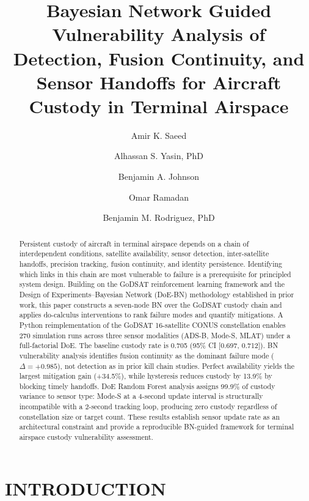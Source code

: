 \documentclass[]{spie}
\title{Bayesian Network Guided Vulnerability Analysis of Detection, Fusion Continuity, and Sensor Handoffs for Aircraft Custody in Terminal Airspace}
\author[a]{Amir K. Saeed}
\author[a]{Alhassan S. Yasin, PhD}
\author[a]{Benjamin A. Johnson}
\author[a]{Omar Ramadan}
\author[a]{Benjamin M. Rodriguez, PhD}
\affil[a]{Whiting School of Engineering EP Program, Johns Hopkins University}
\begin{document}
\maketitle

\begin{abstract}
Persistent custody of aircraft in terminal airspace depends on a chain of interdependent conditions, satellite availability, sensor detection, inter-satellite handoffs, precision tracking, fusion continuity, and identity persistence. Identifying which links in this chain are most vulnerable to failure is a prerequisite for principled system design. Building on the GoDSAT reinforcement learning framework and the Design of Experiments–Bayesian Network (DoE-BN) methodology established in prior work, this paper constructs a seven-node BN over the GoDSAT custody chain and applies do-calculus interventions to rank failure modes and quantify mitigations. A Python reimplementation of the GoDSAT 16-satellite CONUS constellation enables 270 simulation runs across three sensor modalities (ADS-B, Mode-S, MLAT) under a full-factorial DoE. The baseline custody rate is 0.705 (95\% CI [0.697, 0.712]). BN vulnerability analysis identifies fusion continuity as the dominant failure mode ($\Delta = +0.985$), not detection as in prior kill chain studies. Perfect availability yields the largest mitigation gain (+34.5\%), while hysteresis reduces custody by 13.9\% by blocking timely handoffs. DoE Random Forest analysis assigns 99.9\% of custody variance to sensor type: Mode-S at a 4-second update interval is structurally incompatible with a 2-second tracking loop, producing zero custody regardless of constellation size or target count. These results establish sensor update rate as an architectural constraint and provide a reproducible BN-guided framework for terminal airspace custody vulnerability assessment.
\end{abstract}


\section{INTRODUCTION}
\label{sec:intro}
\end{document}
